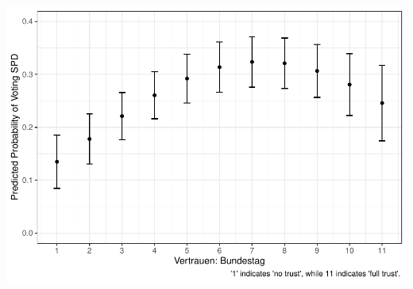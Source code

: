 \documentclass[
]{article}
\begin{document}
\includegraphics{AVCD_Final_Assignment-Edenhofer_files/figure-latex/spd-trust-parliament-1.pdf}
\end{document}
